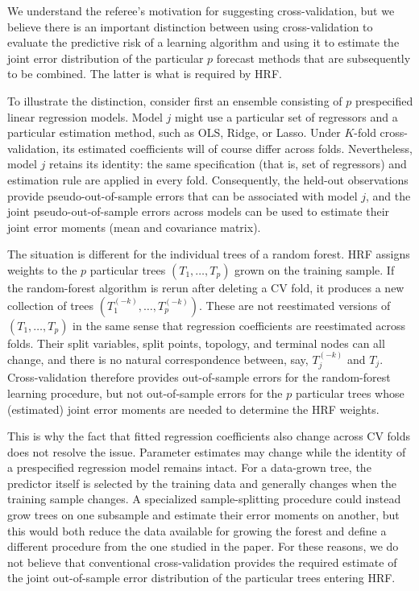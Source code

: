 \documentclass[12pt]{article}
\begin{document}
We understand the referee's motivation for suggesting cross-validation, but we believe there is an important distinction between using cross-validation to evaluate the predictive risk of a learning algorithm and using it to estimate the joint error distribution of the particular $p$ forecast methods that are subsequently to be combined. The latter is what is required by HRF.

To illustrate the distinction, consider first an ensemble consisting of $p$ prespecified linear regression models. Model $j$ might use a particular set of regressors and a particular estimation method, such as OLS, Ridge, or Lasso. Under $K$-fold cross-validation, its estimated coefficients will of course differ across folds. Nevertheless, model $j$ retains its identity: the same specification (that is, set of regressors) and estimation rule are applied in every fold. Consequently, the held-out observations provide pseudo-out-of-sample errors that can be associated with model $j$, and the joint pseudo-out-of-sample errors across models can be used to estimate their joint error moments (mean and covariance matrix).

The situation is different for the individual trees of a random forest. HRF assigns weights to the $p$ particular trees $(T_1,\ldots,T_p)$ grown on the training sample. If the random-forest algorithm is rerun after deleting a CV fold, it produces a new collection of trees $(T_1^{(-k)},\ldots,T_p^{(-k)})$. These are not reestimated versions of $(T_1,\ldots,T_p)$ in the same sense that regression coefficients are reestimated across folds. Their split variables, split points, topology, and terminal nodes can all change, and there is no natural correspondence between, say, $T_j^{(-k)}$ and $T_j$. Cross-validation therefore provides out-of-sample errors for the random-forest learning procedure, but not out-of-sample errors for the $p$ particular trees whose (estimated) joint error moments are needed to determine the HRF weights.

This is why the fact that fitted regression coefficients also change across CV folds does not resolve the issue. Parameter estimates may change while the identity of a prespecified regression model remains intact. For a data-grown tree, the predictor itself is selected by the training data and generally changes when the training sample changes. A specialized sample-splitting procedure could instead grow trees on one subsample and estimate their error moments on another, but this would both reduce the data available for growing the forest and define a different procedure from the one studied in the paper. For these reasons, we do not believe that conventional cross-validation provides the required estimate of the joint out-of-sample error distribution of the particular trees entering HRF.
\end{document}
